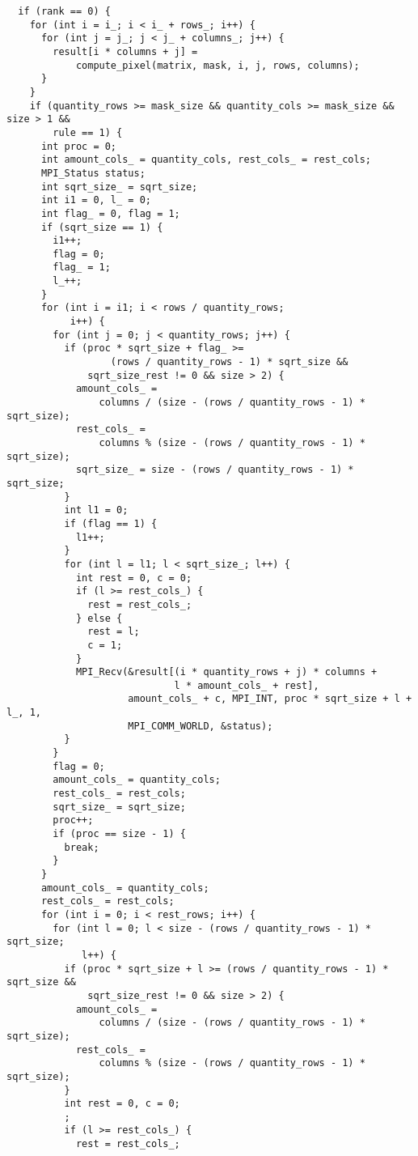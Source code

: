 \documentclass{report}
\begin{document}
\begin{lstlisting}
  if (rank == 0) {
    for (int i = i_; i < i_ + rows_; i++) {
      for (int j = j_; j < j_ + columns_; j++) {
        result[i * columns + j] =
            compute_pixel(matrix, mask, i, j, rows, columns);
      }
    }
    if (quantity_rows >= mask_size && quantity_cols >= mask_size && size > 1 &&
        rule == 1) {
      int proc = 0;
      int amount_cols_ = quantity_cols, rest_cols_ = rest_cols;
      MPI_Status status;
      int sqrt_size_ = sqrt_size;
      int i1 = 0, l_ = 0;
      int flag_ = 0, flag = 1;
      if (sqrt_size == 1) {
        i1++;
        flag = 0;
        flag_ = 1;
        l_++;
      }
      for (int i = i1; i < rows / quantity_rows;
           i++) {  
        for (int j = 0; j < quantity_rows; j++) {
          if (proc * sqrt_size + flag_ >=
                  (rows / quantity_rows - 1) * sqrt_size &&
              sqrt_size_rest != 0 && size > 2) {
            amount_cols_ =
                columns / (size - (rows / quantity_rows - 1) * sqrt_size);
            rest_cols_ =
                columns % (size - (rows / quantity_rows - 1) * sqrt_size);
            sqrt_size_ = size - (rows / quantity_rows - 1) * sqrt_size;
          }
          int l1 = 0;
          if (flag == 1) {
            l1++;
          }
          for (int l = l1; l < sqrt_size_; l++) {
            int rest = 0, c = 0;
            if (l >= rest_cols_) {
              rest = rest_cols_;
            } else {
              rest = l;
              c = 1;
            }
            MPI_Recv(&result[(i * quantity_rows + j) * columns +
                             l * amount_cols_ + rest],
                     amount_cols_ + c, MPI_INT, proc * sqrt_size + l + l_, 1,
                     MPI_COMM_WORLD, &status);
          }
        }
        flag = 0;
        amount_cols_ = quantity_cols;
        rest_cols_ = rest_cols;
        sqrt_size_ = sqrt_size;
        proc++;
        if (proc == size - 1) {
          break;
        }
      }
      amount_cols_ = quantity_cols;
      rest_cols_ = rest_cols;
      for (int i = 0; i < rest_rows; i++) {  
        for (int l = 0; l < size - (rows / quantity_rows - 1) * sqrt_size;
             l++) {
          if (proc * sqrt_size + l >= (rows / quantity_rows - 1) * sqrt_size &&
              sqrt_size_rest != 0 && size > 2) {
            amount_cols_ =
                columns / (size - (rows / quantity_rows - 1) * sqrt_size);
            rest_cols_ =
                columns % (size - (rows / quantity_rows - 1) * sqrt_size);
          }
          int rest = 0, c = 0;
          ;
          if (l >= rest_cols_) {
            rest = rest_cols_;

\end{lstlisting}
\end{document}
